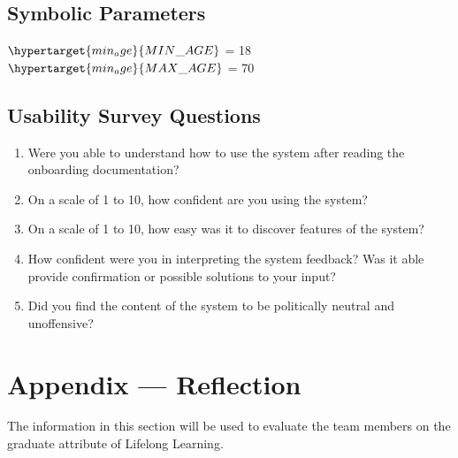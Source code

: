 \documentclass[12pt, titlepage]{article}
\begin{document}
\subsection{Symbolic Parameters}

$\hypertarget{min_age}{MIN\_AGE}$ = 18\\
$\hypertarget{min_age}{MAX\_AGE}$ = 70\\

\subsection{Usability Survey Questions}
\begin{enumerate}
  \item Were you able to understand how to use the system after reading the
    onboarding documentation?
  \item On a scale of 1 to 10, how confident are you using the system?
  \item On a scale of 1 to 10, how easy was it to discover features of the
    system?
  \item How confident were you in interpreting the system feedback? Was it able
    provide confirmation or possible solutions to your input?
  \item Did you find the content of the system to be politically neutral and
    unoffensive?
\end{enumerate}

\newpage{}
\section*{Appendix --- Reflection}

The information in this section will be used to evaluate the team members on the
graduate attribute of Lifelong Learning.


\end{document}
